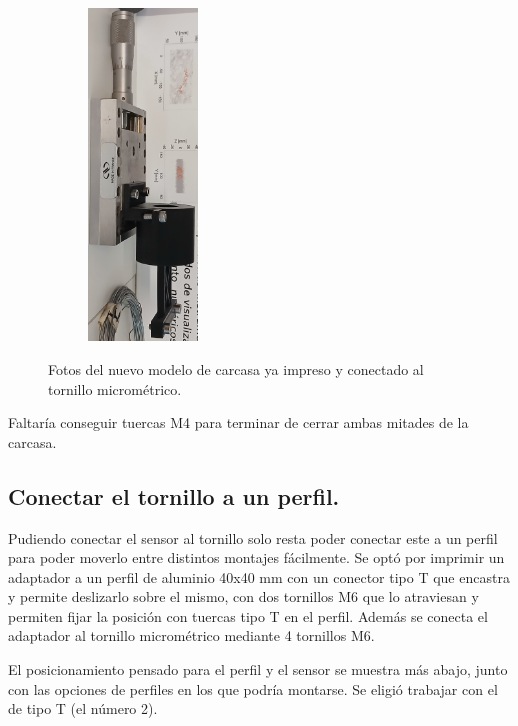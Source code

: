 \begin{figure}[!ht]
\begin{minipage}[c]{0.293054\textwidth}
			\begin{subfigure}{\textwidth}
				\centering
				\includegraphics[height=250pt]{Figures/21_04_2025/Vista_3_4_impresa.jpg}
				\captionsetup{width=0.8\textwidth}
			\end{subfigure}
		\end{minipage}
	\caption{Fotos del nuevo modelo de carcasa ya impreso y conectado al tornillo micrométrico.} %
	\label{fig:}
\end{figure}

Faltaría conseguir tuercas M4 para terminar de cerrar ambas mitades de la carcasa.

\subsection*{Conectar el tornillo a un perfil.}
Pudiendo conectar el sensor al tornillo solo resta poder conectar este a un perfil para poder moverlo entre distintos montajes fácilmente. Se optó por imprimir un adaptador a un perfil de aluminio 40x40 mm con un conector tipo T que encastra y permite deslizarlo sobre el mismo, con dos tornillos M6 que lo atraviesan y permiten fijar la posición con tuercas tipo T en el perfil. Además se conecta el adaptador al tornillo micrométrico mediante 4 tornillos M6. 

El posicionamiento pensado para el perfil y el sensor se muestra más abajo, junto con las opciones de perfiles en los que podría montarse. Se eligió trabajar con el de tipo T (el número 2).

